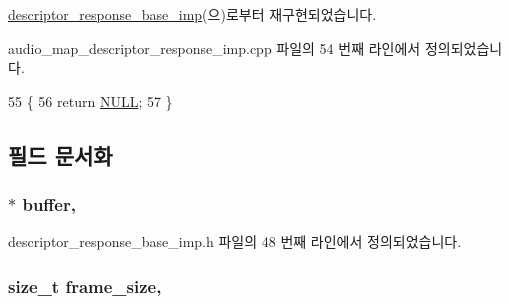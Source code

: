 \hyperlink{classavdecc__lib_1_1descriptor__response__base__imp_a15837e3eb254ad44812cb766ae8cd53c}{descriptor\+\_\+response\+\_\+base\+\_\+imp}(으)로부터 재구현되었습니다.



audio\+\_\+map\+\_\+descriptor\+\_\+response\+\_\+imp.\+cpp 파일의 54 번째 라인에서 정의되었습니다.


\begin{DoxyCode}
55 \{
56     \textcolor{keywordflow}{return} \hyperlink{openavb__types__base__pub_8h_a070d2ce7b6bb7e5c05602aa8c308d0c4}{NULL};
57 \}
\end{DoxyCode}


\subsection{필드 문서화}
\subsubsection[{\texorpdfstring{buffer}{buffer}}]{$\ast$ buffer\hspace{0.3cm}{\ttfamily [protected]}, {\ttfamily [inherited]}}\hypertarget{classavdecc__lib_1_1descriptor__response__base__imp_a56ed84df35de10bdb65e72b184309497}{}\label{classavdecc__lib_1_1descriptor__response__base__imp_a56ed84df35de10bdb65e72b184309497}


descriptor\+\_\+response\+\_\+base\+\_\+imp.\+h 파일의 48 번째 라인에서 정의되었습니다.

\subsubsection[{\texorpdfstring{frame\+\_\+size}{frame_size}}]{\setlength{\rightskip}{0pt plus 5cm}size\+\_\+t frame\+\_\+size\hspace{0.3cm}{\ttfamily [protected]}, {\ttfamily [inherited]}}\hypertarget{classavdecc__lib_1_1descriptor__response__base__imp_affd041a595cabab98275245b9cb2824d}{}\label{classavdecc__lib_1_1descriptor__response__base__imp_affd041a595cabab98275245b9cb2824d}


